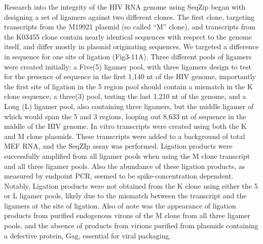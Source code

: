Research into the integrity of the HIV RNA genome using SeqZip began with designing a set of ligamers against two different clones. The first clone, targeting transcripts from the M19921 plasmid (so called ``M'' clone), and transcripts from the K03455 clone contain nearly identical sequences with respect to the genome itself, and differ mostly in plasmid originating sequences. We targeted a difference in sequence for one site of ligation (Fig3-11A). Three different pools of ligamers were created initially: a Five(5) ligamer pool, with three ligamers design to test for the presence of sequence in the first 1,140 nt of the HIV genome, importantly the first site of ligation in the 5 region pool should contain a mismatch in the K clone sequence; a three(3) pool, testing the last 1,210 nt of the genome, and a Long (L) ligamer pool, also containing three ligamers, but the middle ligamer of which would span the 5 and 3 regions, looping out 8,633 nt of sequence in the middle of the HIV genome. In vitro transcripts were created using both the K and M clone plasmids. These transcripts were added to a background of total MEF RNA, and the SeqZIp assay was performed. Ligation products were successfully amplified from all ligamer pools when using the M clone transcript and all three ligamer pools. Also the abundance of these ligation products, as measured by endpoint PCR, seemed to be spike-concentration dependent. Notably, Ligation products were not obtained from the K clone using either the 5 or L ligamer pools, likely due to the mismatch between the transcript and the ligamers at the site of ligation. Also of note was the appearance of ligation products from purified endogenous virons of the M clone from all three ligamer pools, and the absence of products from virions purified from plasmids containing a defective protein, Gag, essential for viral packaging. 

